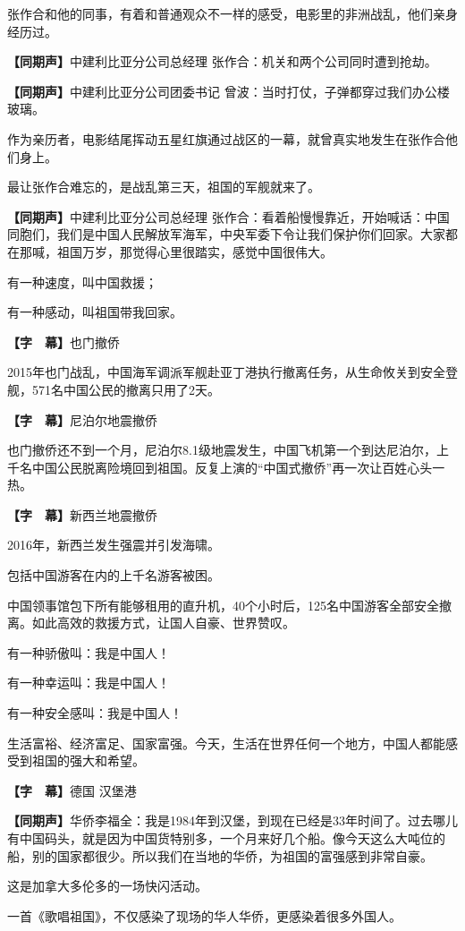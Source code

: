 \documentclass{ctexart}
\newcommand{\zkh}[1]{\textbf{\hspace{-2.7em} 【#1】}}
\begin{document}
张作合和他的同事，有着和普通观众不一样的感受，电影里的非洲战乱，他们亲身经历过。

\zkh{同期声}中建利比亚分公司总经理 张作合：机关和两个公司同时遭到抢劫。

\zkh{同期声}中建利比亚分公司团委书记 曾波：当时打仗，子弹都穿过我们办公楼玻璃。

作为亲历者，电影结尾挥动五星红旗通过战区的一幕，就曾真实地发生在张作合他们身上。

最让张作合难忘的，是战乱第三天，祖国的军舰就来了。

\zkh{同期声}中建利比亚分公司总经理 张作合：看着船慢慢靠近，开始喊话：中国同胞们，我们是中国人民解放军海军，中央军委下令让我们保护你们回家。大家都在那喊，祖国万岁，那觉得心里很踏实，感觉中国很伟大。

有一种速度，叫中国救援；

有一种感动，叫祖国带我回家。

\zkh{字　幕}也门撤侨

2015年也门战乱，中国海军调派军舰赴亚丁港执行撤离任务，从生命攸关到安全登舰，571名中国公民的撤离只用了2天。

\zkh{字　幕}尼泊尔地震撤侨

也门撤侨还不到一个月，尼泊尔8.1级地震发生，中国飞机第一个到达尼泊尔，上千名中国公民脱离险境回到祖国。反复上演的``中国式撤侨''再一次让百姓心头一热。

\zkh{字　幕}新西兰地震撤侨

2016年，新西兰发生强震并引发海啸。

包括中国游客在内的上千名游客被困。

中国领事馆包下所有能够租用的直升机，40个小时后，125名中国游客全部安全撤离。如此高效的救援方式，让国人自豪、世界赞叹。

有一种骄傲叫：我是中国人！

有一种幸运叫：我是中国人！

有一种安全感叫：我是中国人！

生活富裕、经济富足、国家富强。今天，生活在世界任何一个地方，中国人都能感受到祖国的强大和希望。

\zkh{字　幕}德国 汉堡港

\zkh{同期声}华侨李福全：我是1984年到汉堡，到现在已经是33年时间了。过去哪儿有中国码头，就是因为中国货特别多，一个月来好几个船。像今天这么大吨位的船，别的国家都很少。所以我们在当地的华侨，为祖国的富强感到非常自豪。

这是加拿大多伦多的一场快闪活动。

一首《歌唱祖国》，不仅感染了现场的华人华侨，更感染着很多外国人。
\end{document}
